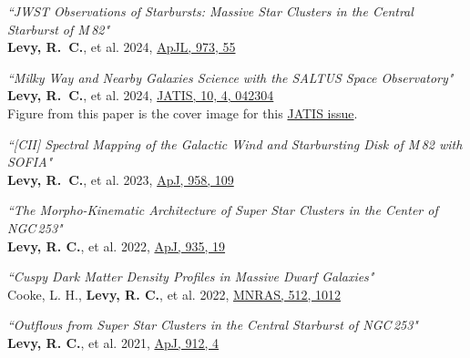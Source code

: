 \documentclass[11pt]{article}
\begin{document}
\begin{etaremune}[itemsep=-18pt]

\item \textit{``JWST Observations of Starbursts: Massive Star Clusters in the Central Starburst of M\,82"}\\
{\bf Levy, R.~C.}, et al. 2024, \href{https://ui.adsabs.harvard.edu/abs/2024arXiv240804135L/abstract}{ApJL, 973, 55} \smallskip\\ 

\item \textit{``Milky Way and Nearby Galaxies Science with the SALTUS Space Observatory"}\\
{\bf Levy, R.~C.}, et al. 2024, \href{https://ui.adsabs.harvard.edu/abs/2024arXiv240416984L/abstract}{JATIS, 10, 4, 042304}\\
{\small Figure from this paper is the cover image for this \href{https://www.spiedigitallibrary.org/journals/Journal-of-Astronomical-Telescopes-Instruments-and-Systems/volume-10/issue-04}{JATIS issue}.}\smallskip\\

\item \textit{``[CII] Spectral Mapping of the Galactic Wind and Starbursting Disk of M\,82 with SOFIA"}\\
{\bf Levy, R.~C.}, et al. 2023, \href{https://ui.adsabs.harvard.edu/abs/2023ApJ...958..109L/abstract}{ApJ, 958, 109} \smallskip\\ 

\item \textit{``The Morpho-Kinematic Architecture of Super Star Clusters in the Center of NGC\,253"}\\
{\bf Levy, R. C.}, et al. 2022, \href{https://ui.adsabs.harvard.edu/abs/2022ApJ...935...19L/abstract}{ApJ, 935, 19} \smallskip\\

\item \textit{``Cuspy Dark Matter Density Profiles in Massive Dwarf Galaxies"}\\
Cooke, L. H., {\bf Levy, R. C.}, et al. 2022, \href{https://ui.adsabs.harvard.edu/abs/2022MNRAS.512.1012C/abstract}{MNRAS, 512, 1012 }\smallskip\\

\item \textit{``Outflows from Super Star Clusters in the Central Starburst of NGC\,253"}\\
{\bf Levy, R. C.}, et al. 2021, \href{https://ui.adsabs.harvard.edu/abs/2021ApJ...912....4L/abstract}{ApJ, 912, 4}\smallskip\\


\end{etaremune}
\end{document}
